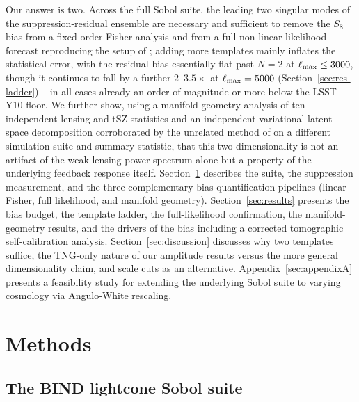 \documentclass[11pt]{article}
\begin{document}
Our answer is two. Across the full Sobol suite, the leading two singular
modes of the suppression-residual ensemble are necessary and sufficient to
remove the $S_8$ bias from a fixed-order Fisher analysis and from a full
non-linear likelihood forecast reproducing the setup of
\citet{robertson2026}; adding more templates mainly inflates the
statistical error, with the residual bias essentially flat past $N=2$ at
$\ell_{\rm max}\le3000$, though it continues to fall by a further
$2$--$3.5\times$ at $\ell_{\rm max}=5000$ (Section~\ref{sec:res-ladder}) --
in all cases already an order of magnitude or more below the LSST-Y10
floor. %
We further show, using a
manifold-geometry analysis of ten independent lensing and tSZ statistics
and an independent variational latent-space decomposition
\citep[Paper~III;][]{bindIII} corroborated by the unrelated method of
\citet{lin2026} on a different simulation suite and summary statistic,
that this two-dimensionality is not an artifact of the weak-lensing power
spectrum alone but a property of the underlying feedback response itself.
Section~\ref{sec:methods} describes the suite, the suppression measurement,
and the three complementary bias-quantification pipelines (linear Fisher,
full likelihood, and manifold geometry). Section~\ref{sec:results} presents
the bias budget, the template ladder, the full-likelihood confirmation, the
manifold-geometry results, and the drivers of the bias including a corrected
tomographic self-calibration analysis. Section~\ref{sec:discussion} discusses
why two templates suffice, the TNG-only nature of our amplitude results
versus the more general dimensionality claim, and scale cuts as an
alternative. Appendix~\ref{sec:appendixA} presents a feasibility study for
extending the underlying Sobol suite to varying cosmology via Angulo-White
rescaling.

\section{Methods}\label{sec:methods}

\subsection{The BIND lightcone Sobol suite}\label{sec:suite}
\end{document}
